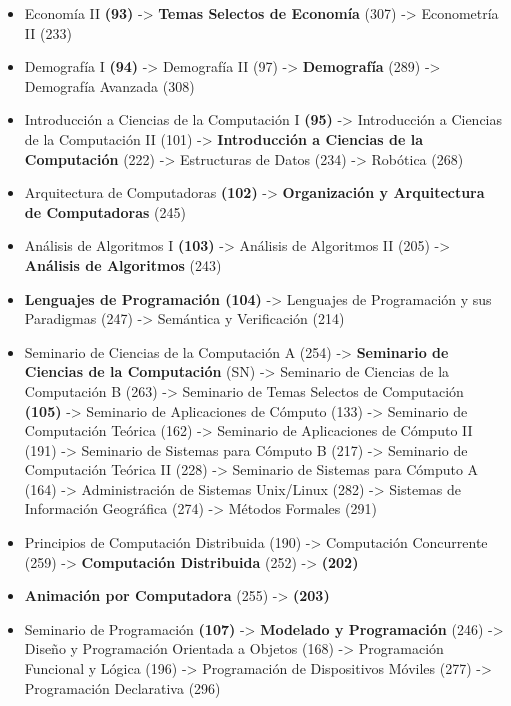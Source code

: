 \begin{appendices}
\begin{itemize}
  \item Economía II \textbf{(93)} -> \textbf{Temas Selectos de Economía} (307) -> Econometría II (233)
  
  \item Demografía I \textbf{(94)} -> Demografía II (97) -> \textbf{Demografía} (289) -> Demografía Avanzada (308)

  \item Introducción a Ciencias de la Computación I \textbf{(95)} -> Introducción a Ciencias de la Computación II (101) -> \textbf{Introducción a Ciencias de la Computación} (222) -> Estructuras de Datos (234) -> Robótica (268)
  
  \item Arquitectura de Computadoras \textbf{(102)} -> \textbf{Organización y Arquitectura de Computadoras} (245)
  
  \item Análisis de Algoritmos I \textbf{(103)} -> Análisis de Algoritmos II (205) -> \textbf{Análisis de Algoritmos} (243)
  
  \item \textbf{Lenguajes de Programación (104)} -> Lenguajes de Programación y sus Paradigmas (247) -> Semántica y Verificación (214)
  
  \item Seminario de Ciencias de la Computación A (254) -> \textbf{Seminario de Ciencias de la Computación} (SN) -> Seminario de Ciencias de la Computación B (263) -> Seminario de Temas Selectos de Computación \textbf{(105)} -> Seminario de Aplicaciones de Cómputo (133) -> Seminario de Computación Teórica (162) -> Seminario de Aplicaciones de Cómputo II (191) -> Seminario de Sistemas para Cómputo B (217) -> Seminario de Computación Teórica II (228) -> Seminario de Sistemas para Cómputo A (164) -> Administración de Sistemas Unix/Linux (282) -> Sistemas de Información Geográfica (274) -> Métodos Formales (291)
  
  \item Principios de Computación Distribuida (190) -> Computación Concurrente (259) -> \textbf{Computación Distribuida} (252) -> \textbf{(202)}
  
  \item \textbf{Animación por Computadora} (255) -> \textbf{(203)}
  
  \item Seminario de Programación \textbf{(107)} -> \textbf{Modelado y Programación} (246) -> Diseño y Programación Orientada a Objetos (168) -> Programación Funcional y Lógica (196) -> Programación de Dispositivos Móviles (277) -> Programación Declarativa (296)
  

\end{itemize}
\end{appendices}
